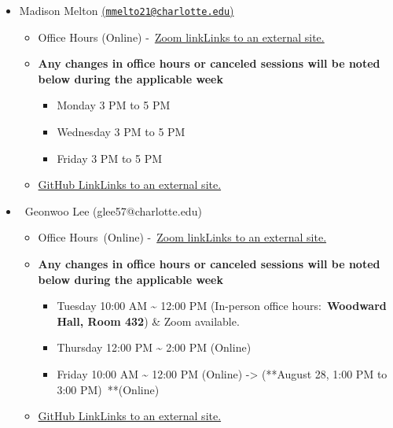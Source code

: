 \documentclass[
]{article}
\providecommand{\tightlist}{%
  \setlength{\itemsep}{0pt}\setlength{\parskip}{0pt}}
\begin{document}
\begin{itemize}
\item
  Madison Melton
  \href{mailto:(mmelto21@charlotte.edu)}{(\href{mailto:mmelto21@charlotte.edu}{\nolinkurl{mmelto21@charlotte.edu}})}

  \begin{itemize}
  \tightlist
  \item
    Office Hours (Online)
    -~\href{https://charlotte-edu.zoom.us/j/92551802491?pwd=ZpMofRkZ2FuLt6LGIA5D0oeXaYX7cS.1}{Zoom
    linkLinks to an external site.}
  \item
    \textbf{Any changes in office hours or canceled sessions will be
    noted below during the applicable week}

    \begin{itemize}
    \tightlist
    \item
      Monday 3 PM to 5 PM
    \item
      Wednesday 3 PM to 5 PM~
    \item
      Friday 3 PM to 5 PM
    \end{itemize}
  \item
    \href{https://github.com/mmelto21-prog}{GitHub LinkLinks to an
    external site.}
  \end{itemize}
\item
  ~Geonwoo Lee (glee57@charlotte.edu)

  \begin{itemize}
  \item
    Office Hours~(Online)
    -~\href{https://charlotte-edu.zoom.us/j/9317544677}{Zoom linkLinks
    to an external site.}
  \item
    \textbf{Any changes in office hours or canceled sessions will be
    noted below during the applicable week}

    \begin{itemize}
    \tightlist
    \item
      Tuesday 10:00 AM \textasciitilde{} 12:00 PM (In-person office
      hours:~\textbf{Woodward Hall, Room 432}) \& Zoom available.
    \item
      Thursday 12:00 PM \textasciitilde{} 2:00 PM (Online)
    \item
      Friday 10:00 AM \textasciitilde{} 12:00 PM (Online)
      -\textgreater{} (**August 28, 1:00 PM to 3:00 PM)~**(Online)
    \end{itemize}
  \item
    \href{https://github.com/Jamesonthehill}{GitHub LinkLinks to an
    external site.}
  \end{itemize}
\end{itemize}
\end{document}
